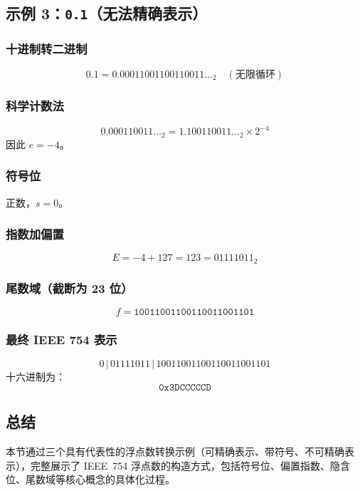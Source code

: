 \subsection{示例 3：\texttt{0.1}（无法精确表示）}

\subsubsection*{十进制转二进制}
\[
0.1 = 0.00011001100110011\ldots_2 \quad (\text{无限循环})
\]

\subsubsection*{科学计数法}
\[
0.000110011\ldots_2 = 1.100110011\ldots_2 \times 2^{-4}
\]
因此 $e=-4$。

\subsubsection*{符号位}
正数，$s=0$。

\subsubsection*{指数加偏置}
\[
E = -4 + 127 = 123 = 01111011_2
\]

\subsubsection*{尾数域（截断为 23 位）}
\[
f = \texttt{10011001100110011001101}
\]

\subsubsection*{最终 IEEE 754 表示}
\[
0 \,|\, 01111011 \,|\, 10011001100110011001101
\]
十六进制为：
\[
\texttt{0x3DCCCCCD}
\]

\subsection{总结}

本节通过三个具有代表性的浮点数转换示例（可精确表示、带符号、不可精确表示），完整展示了 IEEE~754 浮点数的构造方式，包括符号位、偏置指数、隐含位、尾数域等核心概念的具体化过程。































